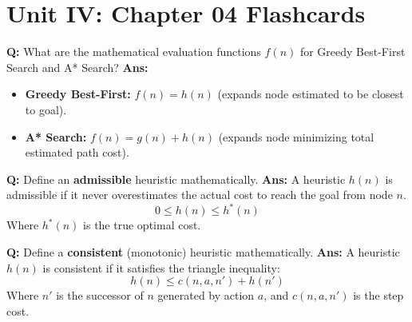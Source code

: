 \documentclass[10pt,a4paper,twocolumn]{article}
\begin{document}
\section*{Unit IV: Chapter 04 Flashcards}

\begin{tcolorbox}[
  colback=white,
  colframe=UnitColorFour,
  colbacktitle=gray!10!white,
  coltitle=black,
  fonttitle=\bfseries\sffamily\small,
  title={Unit IV $\bullet$ Card 1: GBFS vs. A* Evaluation Functions},
  boxrule=1.2pt,
  arc=2mm,
  outer arc=2mm,
  boxsep=1.5mm,
  top=1mm,
  bottom=1mm,
  left=1.5mm,
  right=1.5mm,
  before skip=2.5mm,
  after skip=2.5mm
]
\textbf{Q:} What are the mathematical evaluation functions $f(n)$ for Greedy Best-First Search and A* Search?
\tcbline
\textbf{Ans:} \begin{itemize}
  \item   \textbf{Greedy Best-First:} $f(n) = h(n)$ (expands node estimated to be closest to goal).
  \item   \textbf{A* Search:} $f(n) = g(n) + h(n)$ (expands node minimizing total estimated path cost).
\end{itemize}
\end{tcolorbox}


\begin{tcolorbox}[
  colback=white,
  colframe=UnitColorFour,
  colbacktitle=gray!10!white,
  coltitle=black,
  fonttitle=\bfseries\sffamily\small,
  title={Unit IV $\bullet$ Card 2: Admissible Heuristic},
  boxrule=1.2pt,
  arc=2mm,
  outer arc=2mm,
  boxsep=1.5mm,
  top=1mm,
  bottom=1mm,
  left=1.5mm,
  right=1.5mm,
  before skip=2.5mm,
  after skip=2.5mm
]
\textbf{Q:} Define an \textbf{admissible} heuristic mathematically.
\tcbline
\textbf{Ans:} A heuristic $h(n)$ is admissible if it never overestimates the actual cost to reach the goal from node $n$.
    \[ 0 \le h(n) \le h^*(n) \]
    Where $h^*(n)$ is the true optimal cost.
\end{tcolorbox}


\begin{tcolorbox}[
  colback=white,
  colframe=UnitColorFour,
  colbacktitle=gray!10!white,
  coltitle=black,
  fonttitle=\bfseries\sffamily\small,
  title={Unit IV $\bullet$ Card 3: Consistent Heuristic},
  boxrule=1.2pt,
  arc=2mm,
  outer arc=2mm,
  boxsep=1.5mm,
  top=1mm,
  bottom=1mm,
  left=1.5mm,
  right=1.5mm,
  before skip=2.5mm,
  after skip=2.5mm
]
\textbf{Q:} Define a \textbf{consistent} (monotonic) heuristic mathematically.
\tcbline
\textbf{Ans:} A heuristic $h(n)$ is consistent if it satisfies the triangle inequality:
    \[ h(n) \le c(n, a, n') + h(n') \]
    Where $n'$ is the successor of $n$ generated by action $a$, and $c(n, a, n')$ is the step cost.
\end{tcolorbox}
\end{document}
